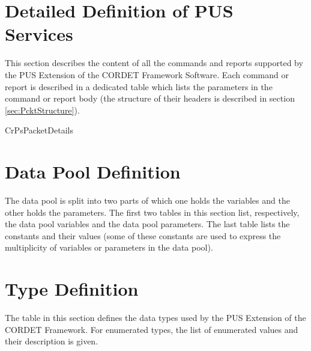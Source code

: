 \documentclass{pnp_article}
\begin{document}
\begin{landscape}
\section{Detailed Definition of PUS Services}
This section describes the content of all the commands and reports supported by the PUS Extension of the CORDET Framework Software. Each command or report is described in a dedicated table which lists the parameters in the command or report body (the structure of their headers is described in section \ref{sec:PcktStructure}).

{CrPsPacketDetails}

\section{Data Pool Definition}
The data pool is split into two parts of which one holds the variables and the other holds the parameters. The first two tables in this section list, respectively, the data pool variables and the data pool parameters. The last table lists the constants and their values (some of these constants are used to express the multiplicity of variables or parameters in the data pool).

\newpage
{}
\newpage 
{}

\section{Type Definition}
The table in this section defines the data types used by the PUS Extension of the CORDET Framework. For enumerated types, the list of enumerated values and their description is given.



\end{landscape}
\end{document}
